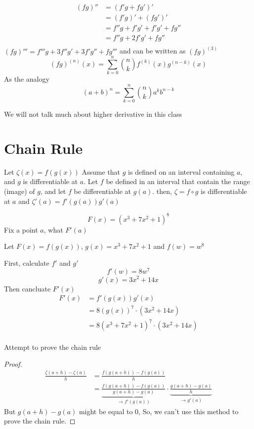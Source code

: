 \begin{example*}
  \begin{align*}
    (fg)'' &= (f'g + fg')' \\
    &= (f'g)' + (fg')' \\
    &= f''g + f'g' + f'g' + fg'' \\
    &= f''g + 2f'g' + fg'' \\
  \end{align*}
  $(fg)''' = f'''g + 3f''g' + 3f'g'' + fg'''$
  and can be written as $(fg)^{(3)}$
  $$(fg)^{(n)}(x) = \sum_{k=0}^n \binom{n}{k} f^{(k)}(x)g^{(n-k)}(x)$$
  As the analogy
  $$(a + b)^n = \sum_{k=0}^n \binom{n}{k} a^k b^{n-k}$$
\end{example*}

We will not talk much about higher derivative in this class

\section{Chain Rule}

Let $\zeta(x) = f(g(x))$
Assume that $g$ is defined on an interval containing $a$, and $g$ is differentiable at \underline{$a$}.
Let $f$ be defined in an interval that contain the range (image) of $g$, and let $f$ be differentiable at $g(a)$.
then, $\zeta = f \circ g$ is differentiable at $a$ and $\zeta'(a) = f'(g(a))g'(a)$

\begin{example*}
  $$F(x) = (x^3 + 7x^2 + 1)^8$$
  Fix a point $a$, what $F'(a)$
  
  
  Let $F(x) = f(g(x))$, $g(x) = x^3 + 7x^2 + 1$ and $f(w) = w^8$

  First, calculate $f'$ and $g'$
  $$f'(w) = 8w^7$$ 
  $$g'(x) = 3x^2 + 14x$$
  Then cancluate $F'(x)$
  \begin{align*}
  F'(x) &= f'(g(x))g'(x) \\
  &= 8(g(x))^7 \cdot (3x^2 + 14x) \\
  &= 8(x^3 + 7x^2 + 1)^7 \cdot (3x^2 + 14x) \\
  \end{align*}
\end{example*}

Attempt to prove the chain rule

\begin{proof}
  \begin{align*}
    \frac{\zeta(a+h) - \zeta(a)}{h} &= \frac{f(g(a+h)) - f(g(a))}{h} \\
    &= \underbrace{\frac{f(g(a+h)) - f(g(a))}{g(a+h) - g(a)}}_{\to f'(g(a))} \cdot \underbrace{\frac{g(a+h) - g(a)}{h}}_{\to g'(a)}
  \end{align*}
  But $g(a+h) - g(a)$ might be equal to $0$, So, we can't use this method to prove the chain rule.
\end{proof}

